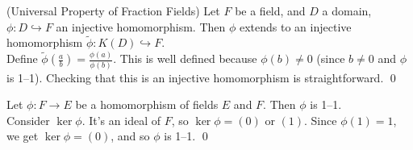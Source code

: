 \thm (Universal Property of Fraction Fields) Let $F$ be a field, and $D$ a domain, $\phi\colon D\hookrightarrow F$ an injective homomorphism.  Then $\phi$ extends to an injective homomorphism $\tilde\phi\colon K(D)\hookrightarrow F$. \\
\pf Define $\tilde\phi(\frac ab)=\frac{\phi(a)}{\phi(b)}$.  This is well defined because $\phi(b)\neq0$ (since $b\neq0$ and $\phi$ is 1--1).  Checking that this is an injective homomorphism is straightforward. \qed

\thm Let $\phi\colon F\to E$ be a homomorphism of fields $E$ and $F$.  Then $\phi$ is 1--1. \\
\pf Consider $\ker\phi$.  It's an ideal of $F$, so $\ker\phi=(0)$ or $(1)$.  Since $\phi(1)=1$, we get $\ker\phi=(0)$, and so $\phi$ is 1--1. \qed
